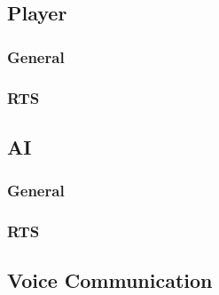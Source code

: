 \subsection{Player}

\subsubsection{General}

\subsubsection{RTS}

\subsection{AI}

\subsubsection{General}

\subsubsection{RTS}

\subsection{Voice Communication}